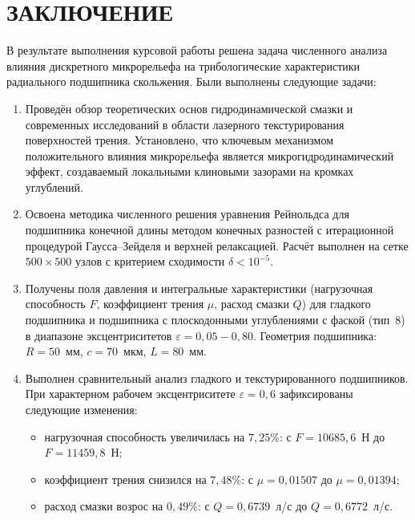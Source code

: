 \section*{ЗАКЛЮЧЕНИЕ}
{}

В результате выполнения курсовой работы решена задача численного анализа влияния дискретного микрорельефа на трибологические характеристики радиального подшипника скольжения. Были выполнены следующие задачи:

\begin{enumerate}
    \item Проведён обзор теоретических основ гидродинамической смазки и современных исследований в области лазерного текстурирования поверхностей трения. Установлено, что ключевым механизмом положительного влияния микрорельефа является микрогидродинамический эффект, создаваемый локальными клиновыми зазорами на кромках углублений.

    \item Освоена методика численного решения уравнения Рейнольдса для подшипника конечной длины методом конечных разностей с итерационной процедурой Гаусса--Зейделя и верхней релаксацией. Расчёт выполнен на сетке $500 \times 500$ узлов с критерием сходимости $\delta < 10^{-5}$.

    \item Получены поля давления и интегральные характеристики (нагрузочная способность $F$, коэффициент трения $\mu$, расход смазки $Q$) для гладкого подшипника и подшипника с плоскодонными углублениями с фаской (тип~8) в диапазоне эксцентриситетов $\varepsilon = 0{,}05 - 0{,}80$. Геометрия подшипника: $R = 50$~мм, $c = 70$~мкм, $L = 80$~мм.

    \item Выполнен сравнительный анализ гладкого и текстурированного подшипников. При характерном рабочем эксцентриситете $\varepsilon = 0{,}6$ зафиксированы следующие изменения:
    \begin{itemize}
        \item нагрузочная способность увеличилась на $7{,}25$\%: с $F = 10685{,}6$~Н до $F = 11459{,}8$~Н;
        \item коэффициент трения снизился на $7{,}48$\%: с $\mu = 0{,}01507$ до $\mu = 0{,}01394$;
        \item расход смазки возрос на $0{,}49$\%: с $Q = 0{,}6739$~л/с до $Q = 0{,}6772$~л/с.
    \end{itemize}
\end{enumerate}

